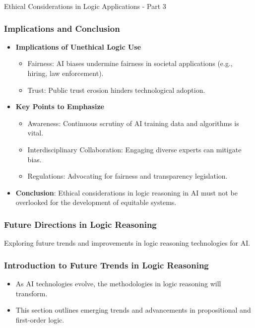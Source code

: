 \documentclass[aspectratio=169]{beamer}
\begin{document}
\begin{frame}[fragile]{Ethical Considerations in Logic Applications - Part 3}
    \frametitle{Implications and Conclusion}
    \begin{itemize}
        \item \textbf{Implications of Unethical Logic Use}
        \begin{itemize}
            \item Fairness: AI biases undermine fairness in societal applications (e.g., hiring, law enforcement).
            \item Trust: Public trust erosion hinders technological adoption.
        \end{itemize}
        
        \item \textbf{Key Points to Emphasize}
        \begin{itemize}
            \item Awareness: Continuous scrutiny of AI training data and algorithms is vital.
            \item Interdisciplinary Collaboration: Engaging diverse experts can mitigate bias.
            \item Regulations: Advocating for fairness and transparency legislation.
        \end{itemize}
        
        \item \textbf{Conclusion}: Ethical considerations in logic reasoning in AI must not be overlooked for the development of equitable systems.
    \end{itemize}
\end{frame}

\begin{frame}[fragile]
    \frametitle{Future Directions in Logic Reasoning}
    Exploring future trends and improvements in logic reasoning technologies for AI.
\end{frame}

\begin{frame}[fragile]
    \frametitle{Introduction to Future Trends in Logic Reasoning}
    \begin{itemize}
        \item As AI technologies evolve, the methodologies in logic reasoning will transform.
        \item This section outlines emerging trends and advancements in propositional and first-order logic.
    \end{itemize}
\end{frame}
\end{document}
